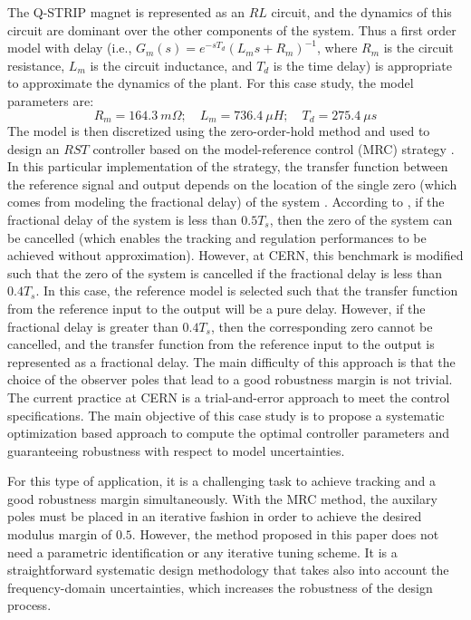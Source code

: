 \documentclass[journal]{IEEEtran}
\begin{document}
The Q-STRIP magnet is represented as an $RL$ circuit, and the dynamics of this circuit are dominant over the other components of the system. Thus a first order model with delay (i.e., $G_m(s) = e^{-sT_d}(L_m s + R_m)^{-1}$, where $R_m$ is the circuit resistance, $L_m$ is the circuit inductance, and $T_d$ is the time delay) is appropriate to approximate the dynamics of the plant. For this case study, the model parameters are:
\begin{equation*}
R_m = 164.3 \: m \Omega; \quad L_m = 736.4 \: \mu H; \quad T_d = 275.4 \: \mu s
\end{equation*}
The model is then discretized using the zero-order-hold method and used to design an $RST$ controller based on the model-reference control (MRC) strategy \cite{LZ06}. In this particular implementation of the strategy, the transfer function between the reference signal and output depends on the location of the single zero (which comes from modeling the fractional delay) of the system \cite{KNM15}. According to \cite{LZ06}, if the fractional delay of the system is less than $0.5T_s$, then the zero of the system can be cancelled (which enables the tracking and regulation performances to be achieved without approximation). However, at CERN, this benchmark is modified such that the zero of the system is cancelled if the fractional delay is less than $0.4T_s$. In this case, the reference model is selected such that the transfer function from the reference input to the output will be a pure delay. However, if the fractional delay is greater than $0.4T_s$, then the corresponding zero cannot be cancelled, and the transfer function from the reference input to the output is represented as a fractional delay. The main difficulty of this approach is that the choice of the observer poles that lead to a good robustness margin is not trivial. The current practice at CERN is a trial-and-error approach to meet the control specifications. The main objective of this case study is to propose a systematic optimization based approach to compute the optimal controller parameters and guaranteeing robustness with respect to model uncertainties. 

For this type of application, it is a challenging task to achieve tracking and a good robustness margin simultaneously. With the MRC method, the auxilary  poles must be placed in an iterative fashion in order to achieve the desired modulus margin of $0.5$. However, the method proposed in this paper does not need a parametric identification or any iterative tuning scheme. It is a straightforward systematic design methodology that takes also into account the frequency-domain uncertainties, which increases the robustness of the design process.
\end{document}
